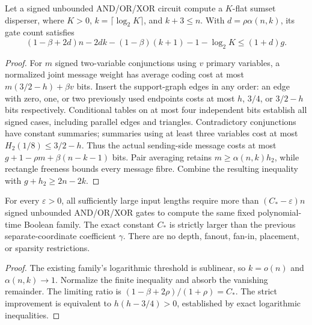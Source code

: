 \begin{theorem}
  \label{thm:lowerbounds-algebraic-geometry-joint-finite}
  \leanok
  Let a signed unbounded AND/OR/XOR circuit compute a $K$-flat sumset disperser,
  where $K>0$, $k=\lceil\log_2K\rceil$, and $k+3\le n$.
  With $d=\rho\alpha(n,k)$, its gate count satisfies
  \[
    (1-\beta+2d)n-2dk-(1-\beta)(k+1)-1-\log_2K\le(1+d)g.
  \]
\end{theorem}
\begin{proof}
  \leanok
  For $m$ signed two-variable conjunctions using $v$ primary variables,
  a normalized joint message weight has average coding cost at most
  $m(3/2-h)+\beta v$ bits. Insert the support-graph edges in any order:
  an edge with zero, one, or two previously used endpoints costs at most
  $h$, $3/4$, or $3/2-h$ bits respectively. Conditional tables on at most
  four independent bits establish all signed cases, including parallel edges
  and triangles. Contradictory conjunctions have constant summaries; summaries
  using at least three variables cost at most $H_2(1/8)\le3/2-h$.
  Thus the actual sending-side message costs at most
  $g+1-\rho m+\beta(n-k-1)$ bits. Pair averaging retains
  $m\ge\alpha(n,k)h_2$, while rectangle freeness bounds every message fibre.
  Combine the resulting inequality with $g+h_2\ge2n-2k$.
\end{proof}

\begin{theorem}
  \label{thm:lowerbounds-algebraic-geometry-joint-explicit}
  \leanok
  For every $\varepsilon>0$, all sufficiently large input lengths require
  more than $(C_*-\varepsilon)n$ signed unbounded AND/OR/XOR gates to compute
  the same fixed polynomial-time Boolean family. The exact constant $C_*$ is
  strictly larger than the previous separate-coordinate coefficient $\gamma$.
  There are no depth, fanout, fan-in, placement, or sparsity restrictions.
\end{theorem}
\begin{proof}
  \leanok
  The existing family's logarithmic threshold is sublinear, so $k=o(n)$ and
  $\alpha(n,k)\to1$. Normalize the finite inequality and absorb the vanishing
  remainder. The limiting ratio is
  $(1-\beta+2\rho)/(1+\rho)=C_*$. The strict improvement is equivalent to
  $h(h-3/4)>0$, established by exact logarithmic inequalities.
\end{proof}

